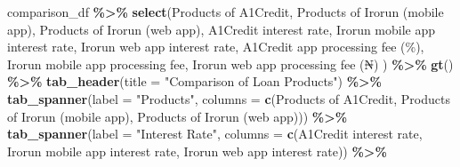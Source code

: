 \documentclass[
]{article}
\newenvironment{Shaded}{\begin{snugshade}}{\end{snugshade}}
\newcommand{\AttributeTok}[1]{\textcolor[rgb]{0.13,0.29,0.53}{#1}}
\newcommand{\FunctionTok}[1]{\textcolor[rgb]{0.13,0.29,0.53}{\textbf{#1}}}
\newcommand{\NormalTok}[1]{#1}
\newcommand{\SpecialCharTok}[1]{\textcolor[rgb]{0.81,0.36,0.00}{\textbf{#1}}}
\newcommand{\StringTok}[1]{\textcolor[rgb]{0.31,0.60,0.02}{#1}}
\begin{document}
\begin{Shaded}
\begin{Highlighting}[]
\NormalTok{comparison\_df }\SpecialCharTok{\%\textgreater{}\%}
  \FunctionTok{select}\NormalTok{(}\StringTok{\textasciigrave{}}\AttributeTok{Products of A1Credit}\StringTok{\textasciigrave{}}\NormalTok{,}
         \StringTok{\textasciigrave{}}\AttributeTok{Products of Irorun (mobile app)}\StringTok{\textasciigrave{}}\NormalTok{,}
         \StringTok{\textasciigrave{}}\AttributeTok{Products of Irorun (web app)}\StringTok{\textasciigrave{}}\NormalTok{,}
         \StringTok{\textasciigrave{}}\AttributeTok{A1Credit interest rate}\StringTok{\textasciigrave{}}\NormalTok{,}
         \StringTok{\textasciigrave{}}\AttributeTok{Irorun mobile app interest rate}\StringTok{\textasciigrave{}}\NormalTok{,}
         \StringTok{\textasciigrave{}}\AttributeTok{Irorun web app interest rate}\StringTok{\textasciigrave{}}\NormalTok{,}
         \StringTok{\textasciigrave{}}\AttributeTok{A1Credit app processing fee (\%)}\StringTok{\textasciigrave{}}\NormalTok{,}
         \StringTok{\textasciigrave{}}\AttributeTok{Irorun mobile app processing fee}\StringTok{\textasciigrave{}}\NormalTok{,}
         \StringTok{\textasciigrave{}}\AttributeTok{Irorun web app processing fee (₦)}\StringTok{\textasciigrave{}}
\NormalTok{  ) }\SpecialCharTok{\%\textgreater{}\%}
  \FunctionTok{gt}\NormalTok{() }\SpecialCharTok{\%\textgreater{}\%}
  \FunctionTok{tab\_header}\NormalTok{(}\AttributeTok{title =} \StringTok{"Comparison of Loan Products"}\NormalTok{) }\SpecialCharTok{\%\textgreater{}\%}
  \FunctionTok{tab\_spanner}\NormalTok{(}\AttributeTok{label =} \StringTok{"Products"}\NormalTok{, }\AttributeTok{columns =} \FunctionTok{c}\NormalTok{(}\StringTok{\textasciigrave{}}\AttributeTok{Products of A1Credit}\StringTok{\textasciigrave{}}\NormalTok{, }\StringTok{\textasciigrave{}}\AttributeTok{Products of Irorun (mobile app)}\StringTok{\textasciigrave{}}\NormalTok{, }\StringTok{\textasciigrave{}}\AttributeTok{Products of Irorun (web app)}\StringTok{\textasciigrave{}}\NormalTok{)) }\SpecialCharTok{\%\textgreater{}\%}
  \FunctionTok{tab\_spanner}\NormalTok{(}\AttributeTok{label =} \StringTok{"Interest Rate"}\NormalTok{, }\AttributeTok{columns =} \FunctionTok{c}\NormalTok{(}\StringTok{\textasciigrave{}}\AttributeTok{A1Credit interest rate}\StringTok{\textasciigrave{}}\NormalTok{, }\StringTok{\textasciigrave{}}\AttributeTok{Irorun mobile app interest rate}\StringTok{\textasciigrave{}}\NormalTok{, }\StringTok{\textasciigrave{}}\AttributeTok{Irorun web app interest rate}\StringTok{\textasciigrave{}}\NormalTok{)) }\SpecialCharTok{\%\textgreater{}\%}

\end{Highlighting}
\end{Shaded}
\end{document}
